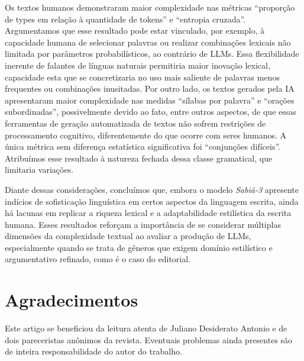 \documentclass[portuguese]{textolivre}
\begin{document}
Os textos humanos demonstraram maior complexidade nas métricas ``proporção de types em relação à quantidade de tokens'' e ``entropia cruzada''.
Argumentamos que esse resultado pode estar vinculado, por exemplo, à capacidade humana de selecionar palavras ou realizar combinações lexicais não limitada por parâmetros probabilísticos, ao contrário de LLMs.
Essa flexibilidade inerente de falantes de línguas naturais permitiria maior inovação lexical, capacidade esta que se concretizaria no uso mais saliente de palavras menos frequentes ou combinações inusitadas.
Por outro lado, os textos gerados pela IA apresentaram maior complexidade nas medidas ``sílabas por palavra'' e ``orações subordinadas'', possivelmente devido ao fato, entre outros aspectos, de que essas ferramentas de geração automatizada de textos não sofrem restrições de processamento cognitivo, diferentemente do que ocorre com seres humanos.
A única métrica sem diferença estatística significativa foi ``conjunções difíceis''.
Atribuímos esse resultado à natureza fechada dessa classe gramatical, que limitaria variações.

Diante dessas considerações, concluímos que, embora o modelo \emph{Sabiá-3} apresente indícios de sofisticação linguística em certos aspectos da linguagem escrita, ainda há lacunas em replicar a riqueza lexical e a adaptabilidade estilística da escrita humana.
Esses resultados reforçam a importância de se considerar múltiplas dimensões da complexidade textual ao avaliar a produção de LLMs, especialmente quando se trata de gêneros que exigem domínio estilístico e argumentativo refinado, como é o caso do editorial.

\section{Agradecimentos}\label{sec-agradecimentos}
Este artigo se beneficiou da leitura atenta de Juliano Desiderato Antonio e de dois pareceristas anônimos da revista. Eventuais problemas ainda presentes são de inteira responsabilidade do autor do trabalho.

\printbibliography\label{sec-bib}


\begin{dataavailability}
\end{dataavailability}
\end{document}
